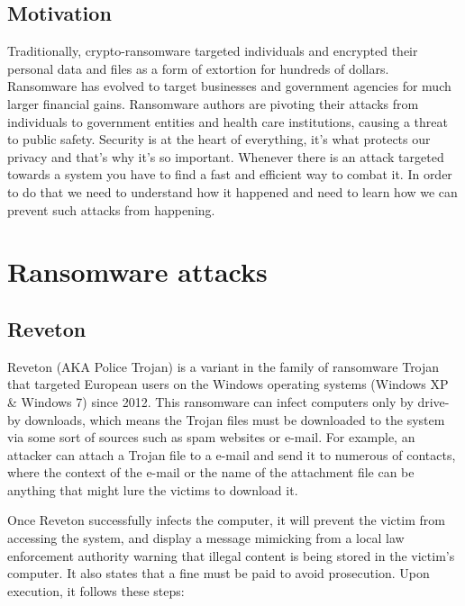 \documentclass[10pt,a4paper]{article}
\begin{document}
\subsection{Motivation}
Traditionally, crypto-ransomware targeted individuals and encrypted their personal data and files as a form of extortion for hundreds of dollars. Ransomware has evolved to target businesses and government agencies for much larger financial gains. Ransomware authors are pivoting their attacks from individuals to government entities and health care institutions, causing a threat to public safety. Security is at the heart of everything, it's what protects our privacy and that's why it's so important. Whenever there is an attack targeted towards a system you have to find a fast and efficient way to combat it. In order to do that we need to understand how it happened and need to learn how we can prevent such attacks from happening.

\section{Ransomware attacks}

\subsection{Reveton}
Reveton (AKA Police Trojan) is a variant in the family of ransomware Trojan that targeted European users on the Windows operating systems (Windows XP \& Windows 7) since 2012. This ransomware can infect computers only by drive-by downloads, which means the Trojan files must be downloaded to the system via some sort of sources such as spam websites or e-mail. For example, an attacker can attach a Trojan file to a e-mail and send it to numerous of contacts, where the context of the e-mail or the name of the attachment file can be anything that might lure the victims to download it.

Once Reveton successfully infects the computer, it will prevent the victim from accessing the system, and display a message mimicking from a local law enforcement authority warning that illegal content is being stored in the victim’s computer. It also states that a fine must be paid to avoid prosecution.
Upon execution, it follows these steps\cite{revetonanalysis}:
\end{document}

